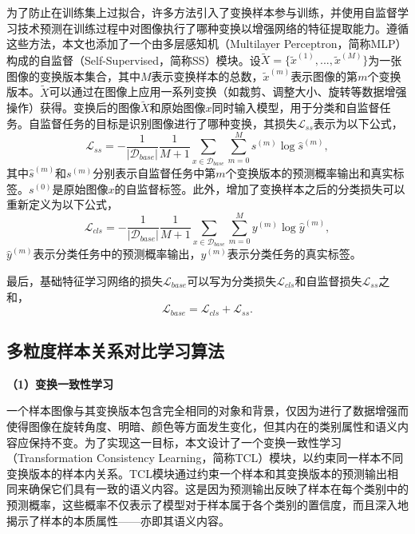 为了防止在训练集上过拟合，许多方法\cite{IER, PAL, SSLforFSL}引入了变换样本参与训练，并使用自监督学习技术预测在训练过程中对图像执行了哪种变换以增强网络的特征提取能力。遵循这些方法，本文也添加了一个由多层感知机（Multilayer Perceptron，简称MLP）构成的自监督（Self-Supervised，简称SS）模块。设$\widetilde{X}=\{\widetilde{x}^{(1)}, ..., \widetilde{x}^{(M)}\}$为一张图像的变换版本集合，其中$M$表示变换样本的总数，$\widetilde{x}^{(m)}$表示图像的第$m$个变换版本。$\widetilde{X}$可以通过在图像上应用一系列变换（如裁剪、调整大小、旋转等数据增强操作）获得。变换后的图像$\widetilde{X}$和原始图像$x$同时输入模型，用于分类和自监督任务。自监督任务的目标是识别图像进行了哪种变换，其损失$\mathcal{L}_{ss}$表示为以下公式，
\begin{equation}
\label{equation3:3.3}
  \mathcal{L}_{ss} = - \frac{1}{|\mathcal{D}_{base}|}\frac{1}{M+1}\sum_{x \in \mathcal{D}_{base}}\sum_{m=0}^{M}s^{(m)}\log\widehat{s}^{(m)},
\end{equation}
其中$\widehat{s}^{(m)}$和$s^{(m)}$分别表示自监督任务中第$m$个变换版本的预测概率输出和真实标签。$s^{(0)}$是原始图像$x$的自监督标签。此外，增加了变换样本之后的分类损失可以重新定义为以下公式，
\begin{equation}
\label{equation3:3.4}
  \mathcal{L}_{cls} = - \frac{1}{|\mathcal{D}_{base}|}\frac{1}{M+1}\sum_{x \in \mathcal{D}_{base}}\sum_{m=0}^{M}y^{(m)}\log\widehat{y}^{(m)},
\end{equation}
$\widehat{y}^{(m)}$表示分类任务中的预测概率输出，$y^{(m)}$表示分类任务的真实标签。

最后，基础特征学习网络的损失$\mathcal{L}_{base}$可以写为分类损失$\mathcal{L}_{cls}$和自监督损失$\mathcal{L}_{ss}$之和，
\begin{equation}
\label{equation3:3.5}
  \mathcal{L}_{base} = \mathcal{L}_{cls} + \mathcal{L}_{ss}.
\end{equation}

\subsection[\hspace{-2pt}多粒度样本关系对比学习算法]{{\heiti{} \hspace{-8pt}多粒度样本关系对比学习算法}}\label{section3: 多粒度样本关系对比学习算法}

\textbf{（1）变换一致性学习}

一个样本图像与其变换版本包含完全相同的对象和背景，仅因为进行了数据增强而使得图像在旋转角度、明暗、颜色等方面发生变化，但其内在的类别属性和语义内容应保持不变。为了实现这一目标，本文设计了一个变换一致性学习（Transformation Consistency Learning，简称TCL）模块，以约束同一样本不同变换版本的样本内关系。TCL模块通过约束一个样本和其变换版本的预测输出相同来确保它们具有一致的语义内容。这是因为预测输出反映了样本在每个类别中的预测概率，这些概率不仅表示了模型对于样本属于各个类别的置信度，而且深入地揭示了样本的本质属性——亦即其语义内容。

